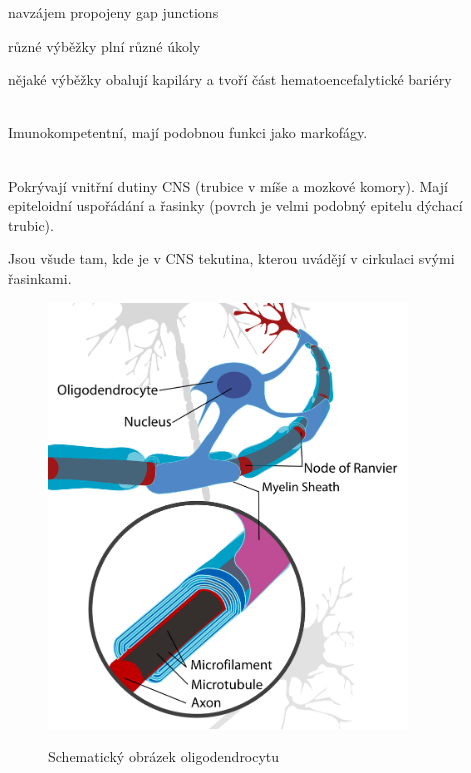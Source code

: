 \documentclass[DIV=8]{scrreprt}
\begin{document}
\begin{description}
\begin{myItemize}[nosep]
    \item navzájem propojeny gap junctions
    \item různé výběžky plní různé úkoly
\begin{myItemize}[nosep]
    \item nějaké výběžky obalují kapiláry a tvoří část hematoencefalytické bariéry
\end{myItemize}

\end{myItemize}




\item[mikroglie]\hfill \\
Imunokompetentní, mají podobnou funkci jako markofágy.


\item[ependymové buňky]\hfill \\
Pokrývají vnitřní dutiny CNS (trubice v míše a mozkové komory). Mají epiteloidní uspořádání a řasinky (povrch je velmi podobný epitelu dýchací trubic).

Jsou všude tam, kde je v CNS tekutina, kterou uvádějí v cirkulaci svými řasinkami.

\end{description}


\begin{figure}
    \caption{Schematický obrázek oligodendrocytu}
    \includegraphics[width=0.85\textwidth]{oligodendrocyt.png}
    \centering
    \label{}
\end{figure}
\end{document}

